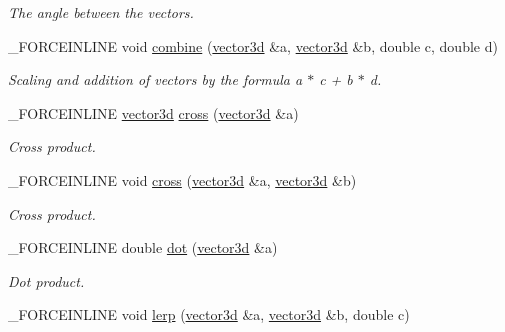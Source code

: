 \begin{DoxyCompactItemize}
\begin{DoxyCompactList}\small\item\em The angle between the vectors. \end{DoxyCompactList}\item 
\hypertarget{classbt_1_1vector3d_aed23b44c6df14932d34172e4baaa7340}{\-\_\-\-F\-O\-R\-C\-E\-I\-N\-L\-I\-N\-E void \hyperlink{classbt_1_1vector3d_aed23b44c6df14932d34172e4baaa7340}{combine} (\hyperlink{classbt_1_1vector3d}{vector3d} \&a, \hyperlink{classbt_1_1vector3d}{vector3d} \&b, double c, double d)}\label{classbt_1_1vector3d_aed23b44c6df14932d34172e4baaa7340}

\begin{DoxyCompactList}\small\item\em Scaling and addition of vectors by the formula a $\ast$ c + b $\ast$ d. \end{DoxyCompactList}\item 
\hypertarget{classbt_1_1vector3d_a04f963d47342a50e53c9c81fdd07016a}{\-\_\-\-F\-O\-R\-C\-E\-I\-N\-L\-I\-N\-E \hyperlink{classbt_1_1vector3d}{vector3d} \hyperlink{classbt_1_1vector3d_a04f963d47342a50e53c9c81fdd07016a}{cross} (\hyperlink{classbt_1_1vector3d}{vector3d} \&a)}\label{classbt_1_1vector3d_a04f963d47342a50e53c9c81fdd07016a}

\begin{DoxyCompactList}\small\item\em Cross product. \end{DoxyCompactList}\item 
\hypertarget{classbt_1_1vector3d_ae2adea99b0da0926a7ae3b6debd2a30d}{\-\_\-\-F\-O\-R\-C\-E\-I\-N\-L\-I\-N\-E void \hyperlink{classbt_1_1vector3d_ae2adea99b0da0926a7ae3b6debd2a30d}{cross} (\hyperlink{classbt_1_1vector3d}{vector3d} \&a, \hyperlink{classbt_1_1vector3d}{vector3d} \&b)}\label{classbt_1_1vector3d_ae2adea99b0da0926a7ae3b6debd2a30d}

\begin{DoxyCompactList}\small\item\em Cross product. \end{DoxyCompactList}\item 
\hypertarget{classbt_1_1vector3d_abde897ea1f7c765fdb1b1784065edb6b}{\-\_\-\-F\-O\-R\-C\-E\-I\-N\-L\-I\-N\-E double \hyperlink{classbt_1_1vector3d_abde897ea1f7c765fdb1b1784065edb6b}{dot} (\hyperlink{classbt_1_1vector3d}{vector3d} \&a)}\label{classbt_1_1vector3d_abde897ea1f7c765fdb1b1784065edb6b}

\begin{DoxyCompactList}\small\item\em Dot product. \end{DoxyCompactList}\item 
\hypertarget{classbt_1_1vector3d_a938d5551f99f114f3078ea7314f99bb8}{\-\_\-\-F\-O\-R\-C\-E\-I\-N\-L\-I\-N\-E void \hyperlink{classbt_1_1vector3d_a938d5551f99f114f3078ea7314f99bb8}{lerp} (\hyperlink{classbt_1_1vector3d}{vector3d} \&a, \hyperlink{classbt_1_1vector3d}{vector3d} \&b, double c)}\label{classbt_1_1vector3d_a938d5551f99f114f3078ea7314f99bb8}


\end{DoxyCompactItemize}
